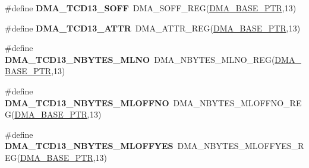 \begin{DoxyCompactItemize}
\item 
\hypertarget{group___d_m_a___register___accessor___macros_ga16316fcc7464927e4acc256cc841b340}{}\#define {\bfseries D\+M\+A\+\_\+\+T\+C\+D13\+\_\+\+S\+O\+F\+F}~D\+M\+A\+\_\+\+S\+O\+F\+F\+\_\+\+R\+E\+G(\hyperlink{group___d_m_a___peripheral_ga6997fbc1b1973e9f27170217a3bd6f22}{D\+M\+A\+\_\+\+B\+A\+S\+E\+\_\+\+P\+T\+R},13)\label{group___d_m_a___register___accessor___macros_ga16316fcc7464927e4acc256cc841b340}

\item 
\hypertarget{group___d_m_a___register___accessor___macros_ga28f938b232c24344f2cc299689aeb089}{}\#define {\bfseries D\+M\+A\+\_\+\+T\+C\+D13\+\_\+\+A\+T\+T\+R}~D\+M\+A\+\_\+\+A\+T\+T\+R\+\_\+\+R\+E\+G(\hyperlink{group___d_m_a___peripheral_ga6997fbc1b1973e9f27170217a3bd6f22}{D\+M\+A\+\_\+\+B\+A\+S\+E\+\_\+\+P\+T\+R},13)\label{group___d_m_a___register___accessor___macros_ga28f938b232c24344f2cc299689aeb089}

\item 
\hypertarget{group___d_m_a___register___accessor___macros_gaab87071d26a96462642ee41f335a33b6}{}\#define {\bfseries D\+M\+A\+\_\+\+T\+C\+D13\+\_\+\+N\+B\+Y\+T\+E\+S\+\_\+\+M\+L\+N\+O}~D\+M\+A\+\_\+\+N\+B\+Y\+T\+E\+S\+\_\+\+M\+L\+N\+O\+\_\+\+R\+E\+G(\hyperlink{group___d_m_a___peripheral_ga6997fbc1b1973e9f27170217a3bd6f22}{D\+M\+A\+\_\+\+B\+A\+S\+E\+\_\+\+P\+T\+R},13)\label{group___d_m_a___register___accessor___macros_gaab87071d26a96462642ee41f335a33b6}

\item 
\hypertarget{group___d_m_a___register___accessor___macros_ga993e012974c139fa90448d13ffab5eb7}{}\#define {\bfseries D\+M\+A\+\_\+\+T\+C\+D13\+\_\+\+N\+B\+Y\+T\+E\+S\+\_\+\+M\+L\+O\+F\+F\+N\+O}~D\+M\+A\+\_\+\+N\+B\+Y\+T\+E\+S\+\_\+\+M\+L\+O\+F\+F\+N\+O\+\_\+\+R\+E\+G(\hyperlink{group___d_m_a___peripheral_ga6997fbc1b1973e9f27170217a3bd6f22}{D\+M\+A\+\_\+\+B\+A\+S\+E\+\_\+\+P\+T\+R},13)\label{group___d_m_a___register___accessor___macros_ga993e012974c139fa90448d13ffab5eb7}

\item 
\hypertarget{group___d_m_a___register___accessor___macros_ga1389c6de1ab258aa1fde43bc72b591f0}{}\#define {\bfseries D\+M\+A\+\_\+\+T\+C\+D13\+\_\+\+N\+B\+Y\+T\+E\+S\+\_\+\+M\+L\+O\+F\+F\+Y\+E\+S}~D\+M\+A\+\_\+\+N\+B\+Y\+T\+E\+S\+\_\+\+M\+L\+O\+F\+F\+Y\+E\+S\+\_\+\+R\+E\+G(\hyperlink{group___d_m_a___peripheral_ga6997fbc1b1973e9f27170217a3bd6f22}{D\+M\+A\+\_\+\+B\+A\+S\+E\+\_\+\+P\+T\+R},13)\label{group___d_m_a___register___accessor___macros_ga1389c6de1ab258aa1fde43bc72b591f0}


\end{DoxyCompactItemize}
